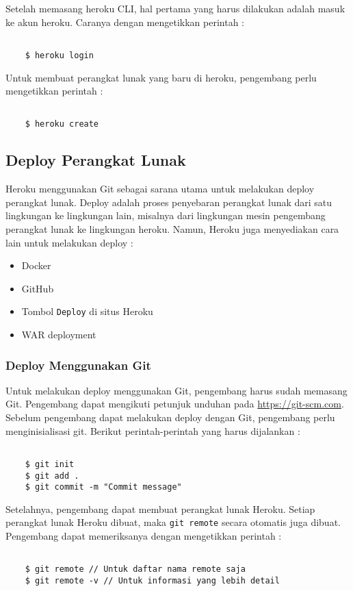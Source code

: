 Setelah memasang heroku CLI, hal pertama yang harus dilakukan adalah masuk ke akun heroku. Caranya dengan mengetikkan perintah :
\begin{lstlisting}

	$ heroku login

\end{lstlisting}

Untuk membuat perangkat lunak yang baru di heroku, pengembang perlu mengetikkan perintah :
\begin{lstlisting}

	$ heroku create

\end{lstlisting}

\subsection{Deploy Perangkat Lunak}
Heroku menggunakan Git sebagai sarana  utama untuk melakukan deploy perangkat lunak. Deploy adalah proses penyebaran perangkat lunak dari satu lingkungan ke lingkungan lain, misalnya dari lingkungan mesin pengembang perangkat lunak ke lingkungan heroku. Namun, Heroku juga menyediakan cara lain untuk melakukan deploy :
\begin{itemize}
\item Docker
\item GitHub
\item Tombol \texttt{Deploy} di situs Heroku
\item WAR deployment
\end{itemize}

\subsubsection{Deploy Menggunakan Git}
Untuk melakukan deploy menggunakan Git, pengembang harus sudah memasang Git. Pengembang dapat mengikuti petunjuk unduhan pada \url{https://git-scm.com}. Sebelum pengembang dapat melakukan deploy dengan Git, pengembang perlu menginisialisasi git. Berikut perintah-perintah yang harus dijalankan :
\begin{lstlisting}

	$ git init
	$ git add .
	$ git commit -m "Commit message"

\end{lstlisting}

Setelahnya, pengembang dapat membuat perangkat lunak Heroku. Setiap perangkat lunak Heroku dibuat, maka \texttt{git remote} secara otomatis juga dibuat. Pengembang dapat memeriksanya dengan mengetikkan perintah :
\begin{lstlisting}

	$ git remote // Untuk daftar nama remote saja
	$ git remote -v // Untuk informasi yang lebih detail

\end{lstlisting}

